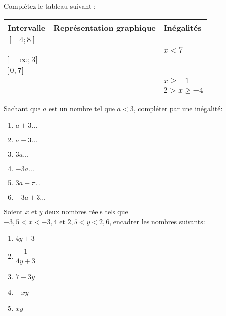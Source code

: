 

\begin{exercice}[]
Complétez le tableau suivant :

\begin{center}
\renewcommand{\arraystretch}{2}
\begin{tabular}{|>{\centering\arraybackslash}p{1.8cm}|>{\centering\arraybackslash}p{2.9cm}|>{\centering\arraybackslash}p{2.1cm}|}
\hline
\rowcolor[gray]{0.8}Intervalle & Représentation graphique & Inégalités\\\hline
$[-4;8]$&&\\\hline
&&$x<7$\\\hline
$]-\infty;3]$&&\\\hline
$]0;7]$&&\\\hline
&&$x\geq -1$\\\hline
&&$2>x\geq -4$\\\hline
\end{tabular}
\end{center}
\end{exercice}

\begin{exercice}[]
Sachant que $a$ est un nombre tel que $a<3$, compléter par une inégalité:
\setlength{\columnseprule}{0pt}
\begin{multicols}{2}[\raggedcolumns]
\begin{enumerate}
\item $a+3 ...$
\item $a-3 ...$
\item $3a ...$
\item $-3a ...$
\item $3a-\pi ...$
\item $-3a+3 ...$
\end{enumerate}
\end{multicols}
\end{exercice}

\begin{exercice}[]
Soient $x$ et $y$ deux nombres réels tels que\\
$-3,5<x<-3,4$ et $2,5<y<2,6$, encadrer les nombres suivants:
\setlength{\columnseprule}{0pt}
\begin{multicols}{2}[\raggedcolumns]
\begin{enumerate}
\item $4y+3$
\item $\dfrac{1}{4y+3}$
\item $7-3y$
\item $-xy$
\item $xy$
\end{enumerate}
\end{multicols}
\end{exercice}

